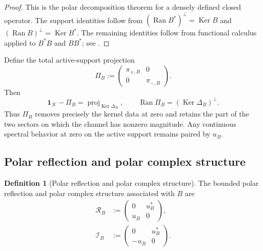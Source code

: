 \documentclass[11pt,reqno]{scrartcl}
\newcommand{\scrK}{\mathscr K}
\newcommand{\idop}{\mathbf 1}
\newcommand{\DeltaB}{\Delta}
\DeclareMathOperator{\Ran}{Ran}
\DeclareMathOperator{\Ker}{Ker}
\theoremstyle{plain}
\theoremstyle{definition}
\newtheorem{definition}[definition]{Definition}
\theoremstyle{remark}
\begin{document}
\begin{proof}
This is the polar decomposition theorem for a densely defined closed
operator.  The support identities follow from
\((\Ran B^*)^\perp=\Ker B\) and
\((\Ran B)^\perp=\Ker B^*\).  The remaining identities follow from
functional calculus applied to \(B^*B\) and \(BB^*\); see
\cite{Kato,ReedSimon}.
\end{proof}

Define the total active-support projection
\begin{equation}
  \Pi_B:=
  \begin{pmatrix}
    \pi_{+,B}&0\\
    0&\pi_{-,B}
  \end{pmatrix}.
  \label{eq:PiB}
\end{equation}
Then
\begin{equation}
  \idop_{\scrK}-\Pi_B=\operatorname{proj}_{\Ker\DeltaB_B},
  \qquad
  \Ran\Pi_B=(\Ker\DeltaB_B)^\perp.
  \label{eq:PiB-kernel}
\end{equation}
Thus \(\Pi_B\) removes precisely the kernel data at zero and retains the
part of the two sectors on which the channel has nonzero magnitude.  Any
continuous spectral behavior at zero on the active support remains paired by
\(u_B\).

\subsection{Polar reflection and polar complex structure}

\begin{definition}[Polar reflection and polar complex structure]
\label{def:polar-phases}
The bounded polar reflection and polar complex structure associated with
\(B\) are
\begin{align}
  \mathcal R_B
  &:={}
  \begin{pmatrix}
    0&u_B^*\\
    u_B&0
  \end{pmatrix},
  \label{eq:polar-reflection}\\
  \mathcal I_B
  &:={}
  \begin{pmatrix}
    0&u_B^*\\
    -u_B&0
  \end{pmatrix}.
  \label{eq:polar-complex}
\end{align}
\end{definition}
\end{document}
